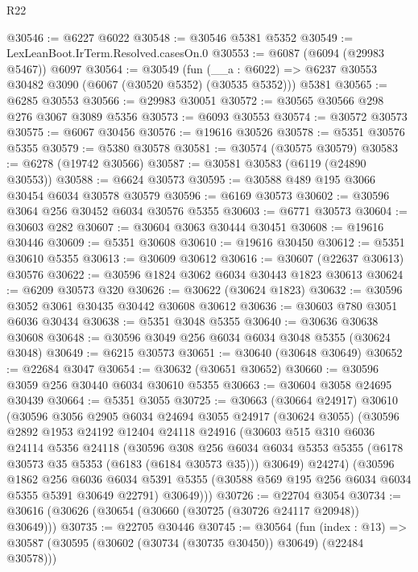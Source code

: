 \begin{lexlean}{R22}
\begin{coremodule}
@30546 := @6227 @6022
@30548 := @30546 @5381 @5352
@30549 := LexLeanBoot.IrTerm.Resolved.casesOn.{0}
@30553 := @6087 (@6094 (@29983 @5467)) @6097
@30564 := @30549
    (fun (__a : @6022) => @6237 @30553 @30482 @3090 (@6067 (@30520 @5352) (@30535 @5352)))
    @5381
@30565 := @6285 @30553
@30566 := @29983 @30051
@30572 := @30565 @30566 @298 @276 @3067 @3089 @5356
@30573 := @6093 @30553
@30574 := @30572 @30573
@30575 := @6067 @30456
@30576 := @19616 @30526
@30578 := @5351 @30576 @5355
@30579 := @5380 @30578
@30581 := @30574 (@30575 @30579)
@30583 := @6278 (@19742 @30566)
@30587 := @30581 @30583 (@6119 (@24890 @30553))
@30588 := @6624 @30573
@30595 := @30588 @489 @195 @3066 @30454 @6034 @30578 @30579
@30596 := @6169 @30573
@30602 := @30596 @3064 @256 @30452 @6034 @30576 @5355
@30603 := @6771 @30573
@30604 := @30603 @282
@30607 := @30604 @3063 @30444 @30451
@30608 := @19616 @30446
@30609 := @5351 @30608
@30610 := @19616 @30450
@30612 := @5351 @30610 @5355
@30613 := @30609 @30612
@30616 := @30607 (@22637 @30613) @30576
@30622 := @30596 @1824 @3062 @6034 @30443 @1823 @30613
@30624 := @6209 @30573 @320
@30626 := @30622 (@30624 @1823)
@30632 := @30596 @3052 @3061 @30435 @30442 @30608 @30612
@30636 := @30603 @780 @3051 @6036 @30434
@30638 := @5351 @3048 @5355
@30640 := @30636 @30638 @30608
@30648 := @30596 @3049 @256 @6034 @6034 @3048 @5355 (@30624 @3048)
@30649 := @6215 @30573
@30651 := @30640 (@30648 @30649)
@30652 := @22684 @3047
@30654 := @30632 (@30651 @30652)
@30660 := @30596 @3059 @256 @30440 @6034 @30610 @5355
@30663 := @30604 @3058 @24695 @30439
@30664 := @5351 @3055
@30725 := @30663
    (@30664 @24917)
    @30610
    (@30596
      @3056
      @2905
      @6034
      @24694
      @3055
      @24917
      (@30624 @3055)
      (@30596
        @2892
        @1953
        @24192
        @12404
        @24118
        @24916
        (@30603
          @515
          @310
          @6036
          @24114
          @5356
          @24118
          (@30596
            @308
            @256
            @6034
            @6034
            @5353
            @5355
            (@6178 @30573 @35 @5353 (@6183 (@6184 @30573 @35)))
            @30649)
          @24274)
        (@30596
          @1862
          @256
          @6036
          @6034
          @5391
          @5355
          (@30588 @569 @195 @256 @6034 @6034 @5355 @5391 @30649 @22791)
          @30649)))
@30726 := @22704 @3054
@30734 := @30616 (@30626 (@30654 (@30660 (@30725 (@30726 @24117 @20948)) @30649)))
@30735 := @22705 @30446
@30745 := @30564
    (fun (index : @13) => @30587 (@30595 (@30602 (@30734 (@30735 @30450)) @30649) (@22484 @30578)))

\end{coremodule}
\end{lexlean}
